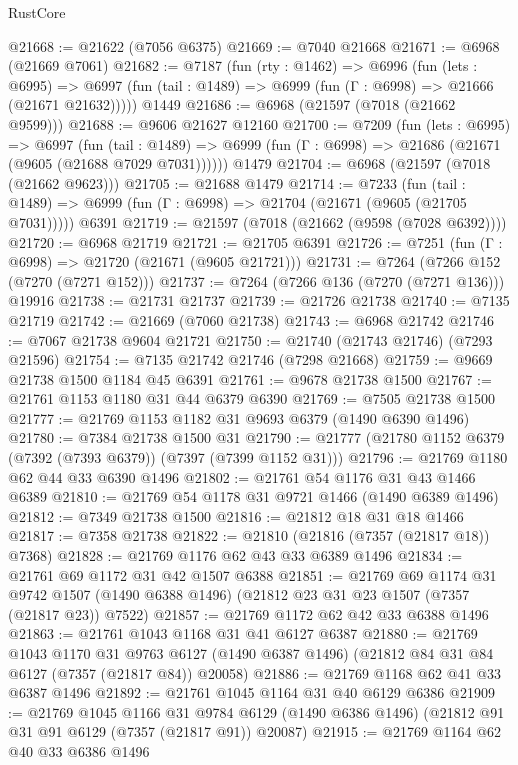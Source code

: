 \begin{lexlean}{RustCore}
\begin{coremodule}
@21668 := @21622 (@7056 @6375)
@21669 := @7040 @21668
@21671 := @6968 (@21669 @7061)
@21682 := @7187
    (fun (rty : @1462) =>
    @6996
      (fun (lets : @6995) =>
      @6997 (fun (tail : @1489) => @6999 (fun (Γ : @6998) => @21666 (@21671 @21632)))))
    @1449
@21686 := @6968 (@21597 (@7018 (@21662 @9599)))
@21688 := @9606 @21627 @12160
@21700 := @7209
    (fun (lets : @6995) =>
    @6997
      (fun (tail : @1489) =>
      @6999 (fun (Γ : @6998) => @21686 (@21671 (@9605 (@21688 @7029 @7031))))))
    @1479
@21704 := @6968 (@21597 (@7018 (@21662 @9623)))
@21705 := @21688 @1479
@21714 := @7233
    (fun (tail : @1489) => @6999 (fun (Γ : @6998) => @21704 (@21671 (@9605 (@21705 @7031)))))
    @6391
@21719 := @21597 (@7018 (@21662 (@9598 (@7028 @6392))))
@21720 := @6968 @21719
@21721 := @21705 @6391
@21726 := @7251 (fun (Γ : @6998) => @21720 (@21671 (@9605 @21721)))
@21731 := @7264 (@7266 @152 (@7270 (@7271 @152)))
@21737 := @7264 (@7266 @136 (@7270 (@7271 @136))) @19916
@21738 := @21731 @21737
@21739 := @21726 @21738
@21740 := @7135 @21719
@21742 := @21669 (@7060 @21738)
@21743 := @6968 @21742
@21746 := @7067 @21738 @9604 @21721
@21750 := @21740 (@21743 @21746) (@7293 @21596)
@21754 := @7135 @21742 @21746 (@7298 @21668)
@21759 := @9669 @21738 @1500 @1184 @45 @6391
@21761 := @9678 @21738 @1500
@21767 := @21761 @1153 @1180 @31 @44 @6379 @6390
@21769 := @7505 @21738 @1500
@21777 := @21769 @1153 @1182 @31 @9693 @6379 (@1490 @6390 @1496)
@21780 := @7384 @21738 @1500 @31
@21790 := @21777 (@21780 @1152 @6379 (@7392 (@7393 @6379)) (@7397 (@7399 @1152 @31)))
@21796 := @21769 @1180 @62 @44 @33 @6390 @1496
@21802 := @21761 @54 @1176 @31 @43 @1466 @6389
@21810 := @21769 @54 @1178 @31 @9721 @1466 (@1490 @6389 @1496)
@21812 := @7349 @21738 @1500
@21816 := @21812 @18 @31 @18 @1466
@21817 := @7358 @21738
@21822 := @21810 (@21816 (@7357 (@21817 @18)) @7368)
@21828 := @21769 @1176 @62 @43 @33 @6389 @1496
@21834 := @21761 @69 @1172 @31 @42 @1507 @6388
@21851 := @21769
    @69
    @1174
    @31
    @9742
    @1507
    (@1490 @6388 @1496)
    (@21812 @23 @31 @23 @1507 (@7357 (@21817 @23)) @7522)
@21857 := @21769 @1172 @62 @42 @33 @6388 @1496
@21863 := @21761 @1043 @1168 @31 @41 @6127 @6387
@21880 := @21769
    @1043
    @1170
    @31
    @9763
    @6127
    (@1490 @6387 @1496)
    (@21812 @84 @31 @84 @6127 (@7357 (@21817 @84)) @20058)
@21886 := @21769 @1168 @62 @41 @33 @6387 @1496
@21892 := @21761 @1045 @1164 @31 @40 @6129 @6386
@21909 := @21769
    @1045
    @1166
    @31
    @9784
    @6129
    (@1490 @6386 @1496)
    (@21812 @91 @31 @91 @6129 (@7357 (@21817 @91)) @20087)
@21915 := @21769 @1164 @62 @40 @33 @6386 @1496

\end{coremodule}
\end{lexlean}
